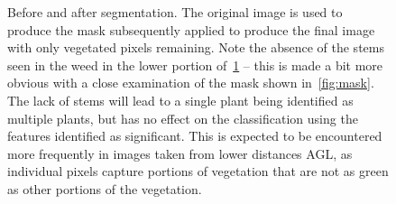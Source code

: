 \documentclass[12pt]{article}
\begin{document}
\begin{figure}[H]
\begin{subfigure}[h]{.20\textwidth}
	  \label{fig:original-masked}
	\end{subfigure}
	\caption[Before and after segmentation]{Before and after segmentation. The original image is used to produce the mask subsequently applied to produce the final image with only vegetated pixels remaining. Note the absence of the stems seen in the weed in the lower portion of~\ref{fig:original-masked} -- this is made a bit more obvious with a close examination of the mask shown in~\ref{fig:mask}. The lack of stems will lead to a single plant being identified as multiple plants, but has no effect on the classification using the features identified as significant. This is expected to be encountered more frequently in images taken from lower distances AGL, as individual pixels capture portions of vegetation that are not as green as other portions of the vegetation.}
	\label{fig:segmentation}
\end{figure}
%
%
\end{document}
